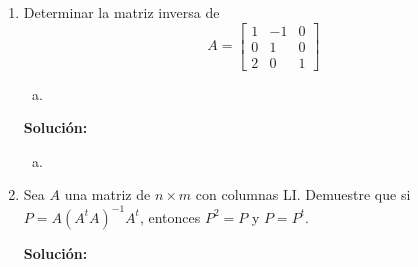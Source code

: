 \documentclass[12pt]{article}
\newenvironment{solucion}
{\begin{mdframed}[backgroundcolor=black!10]
		{\bf Solución:}\\
	}
	{
	\end{mdframed}
}
\newenvironment{preguntas}
{\begin{enumerate}\itemsep12pt
	}
	{
	\end{enumerate}
}
\begin{document}
\begin{preguntas}
\begin{solucion}
$$\begin{bmatrix}
		1 & 0 & 0\\
		0 & 1 & 3\\
		0 & 0 & 1
		\end{bmatrix}, E_6^{-1} = \begin{bmatrix}
		1 & 0 & 6\\
		0 & 1 & 0\\
		0 & 0 & 1
		\end{bmatrix}$$
		Finalmente,
		$$A = \begin{bmatrix}
		1 & 0 & 0\\
		-1 & 1 & 0\\
		0 & 0 & 1
		\end{bmatrix}\begin{bmatrix}
		1 & 0 & 0\\
		0 & 1 & 0\\
		0 & \frac{5}{2} & 1
		\end{bmatrix}\begin{bmatrix}
		1 & 0 & 0\\
		0 & 1 & 0\\
		0 & 0 & \frac{1}{16}
		\end{bmatrix}\begin{bmatrix}
		1 & 0 & 0\\
		0 & -\frac{1}{2} & 0\\
		0 & 0 & 1
		\end{bmatrix}\begin{bmatrix}
		1 & 0 & 0\\
		0 & 1 & 3\\
		0 & 0 & 1
		\end{bmatrix}\begin{bmatrix}
		1 & 0 & 6\\
		0 & 1 & 0\\
		0 & 0 & 1
		\end{bmatrix}$$
\end{solucion}
\item Determinar la matriz inversa de
$$A = \begin{bmatrix}
1 & -1 & 0 \\
0 & 1 & 0 \\
2 & 0 & 1
\end{bmatrix}$$
\begin{enumerate}[a)]
\item 
\end{enumerate}
\begin{solucion}

\begin{enumerate}[a)]
\item 
\end{enumerate}
\end{solucion}
\item Sea $A$ una matriz de $n\times m$ con columnas LI. Demuestre que si $P=A(A^tA)^{-1}A^{t}$, entonces $P^2=P$ y $P=P^t$.
\begin{solucion}

\end{solucion}
\end{preguntas}
\end{document}
